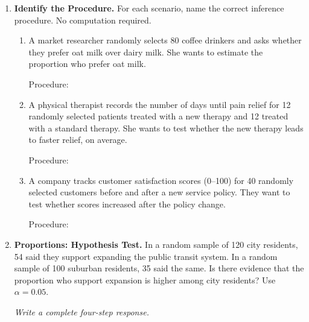 \documentclass[10pt]{article}
\begin{document}
\namedateperiod

\vspace{0.12in}

\begin{enumerate}

\item \textbf{Identify the Procedure.} \; For each scenario, name the correct inference
      procedure. No computation required.

\begin{enumerate}[label=\alph*.]
  \item A market researcher randomly selects 80 coffee drinkers and asks whether they prefer
        oat milk over dairy milk. She wants to estimate the proportion who prefer oat milk.

        Procedure: \blank{9cm}

  \item A physical therapist records the number of days until pain relief for 12 randomly
        selected patients treated with a new therapy and 12 treated with a standard therapy.
        She wants to test whether the new therapy leads to faster relief, on average.

        Procedure: \blank{9cm}

  \item A company tracks customer satisfaction scores (0--100) for 40 randomly selected
        customers before and after a new service policy. They want to test whether scores
        increased after the policy change.

        Procedure: \blank{9cm}
\end{enumerate}

\vspace{0.10in}

\item \textbf{Proportions: Hypothesis Test.} \;
      In a random sample of 120 city residents, 54 said they support expanding the public
      transit system. In a random sample of 100 suburban residents, 35 said the same.
      Is there evidence that the proportion who support expansion is higher among city
      residents? Use $\alpha = 0.05$.

      \textit{Write a complete four-step response.}


\end{enumerate}
\end{document}
